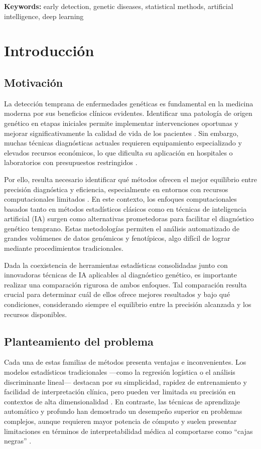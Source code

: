 \documentclass[11pt,a4paper,spanish]{book}
\numberwithin{equation}{chapter}
\numberwithin{figure}{chapter}
\begin{document}
{\bf Keywords:} early detection, genetic diseases, statistical methods, artificial intelligence, deep learning




\mainmatter
\chapter{Introducción}

\section{Motivación}
La detección temprana de enfermedades genéticas es fundamental en la medicina moderna por sus beneficios clínicos evidentes. Identificar una patología de origen genético en etapas iniciales permite implementar intervenciones oportunas y mejorar significativamente la calidad de vida de los pacientes \cite{Sander2000-sm}. Sin embargo, muchas técnicas diagnósticas actuales requieren equipamiento especializado y elevados recursos económicos, lo que dificulta su aplicación en hospitales o laboratorios con presupuestos restringidos \cite{economic_stjhon}. 

Por ello, resulta necesario identificar qué métodos ofrecen el mejor equilibrio entre precisión diagnóstica y eficiencia, especialmente en entornos con recursos computacionales limitados \cite{pranav_ia}. En este contexto, los enfoques computacionales basados tanto en métodos estadísticos clásicos como en técnicas de inteligencia artificial (IA) surgen como alternativas prometedoras para facilitar el diagnóstico genético temprano. Estas metodologías permiten el análisis automatizado de grandes volúmenes de datos genómicos y fenotípicos, algo difícil de lograr mediante procedimientos tradicionales. 

Dada la coexistencia de herramientas estadísticas consolidadas junto con innovadoras técnicas de IA aplicables al diagnóstico genético, es importante realizar una comparación rigurosa de ambos enfoques. Tal comparación resulta crucial para determinar cuál de ellos ofrece mejores resultados y bajo qué condiciones, considerando siempre el equilibrio entre la precisión alcanzada y los recursos disponibles.

\section{Planteamiento del problema}
Cada una de estas familias de métodos presenta ventajas e inconvenientes. Los modelos estadísticos tradicionales —como la regresión logística o el análisis discriminante lineal— destacan por su simplicidad, rapidez de entrenamiento y facilidad de interpretación clínica, pero pueden ver limitada su precisión en contextos de alta dimensionalidad \cite{1364-503X}. En contraste, las técnicas de aprendizaje automático y profundo han demostrado un desempeño superior en problemas complejos, aunque requieren mayor potencia de cómputo y suelen presentar limitaciones en términos de interpretabilidad médica al comportarse como “cajas negras” \cite{rudin_2019}. 
\end{document}
